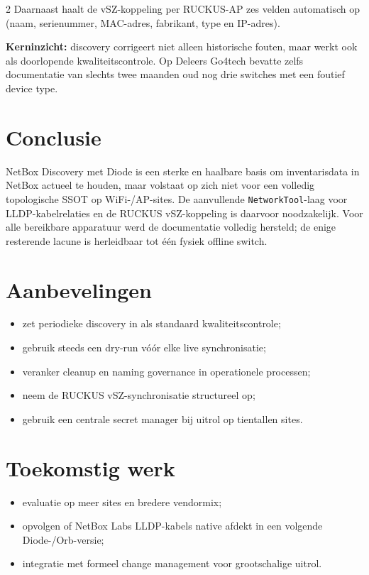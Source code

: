 \documentclass[a0,portrait]{hogent-poster}
\begin{document}
\begin{multicols}{2}
Daarnaast haalt de vSZ-koppeling per RUCKUS-AP zes velden automatisch op (naam, serienummer, MAC-adres, fabrikant, type en IP-adres).

\textbf{Kerninzicht:} discovery corrigeert niet alleen historische fouten, maar werkt ook als doorlopende kwaliteitscontrole. Op Deleers Go4tech bevatte zelfs documentatie van slechts twee maanden oud nog drie switches met een foutief device type.

\section{Conclusie}

NetBox Discovery met Diode is een sterke en haalbare basis om inventarisdata in NetBox actueel te houden, maar volstaat op zich niet voor een volledig topologische SSOT op WiFi-/AP-sites. De aanvullende \texttt{NetworkTool}-laag voor LLDP-kabelrelaties en de RUCKUS vSZ-koppeling is daarvoor noodzakelijk. Voor alle bereikbare apparatuur werd de documentatie volledig hersteld; de enige resterende lacune is herleidbaar tot één fysiek offline switch.

\section{Aanbevelingen}

\begin{itemize}
  \item zet periodieke discovery in als standaard kwaliteitscontrole;
  \item gebruik steeds een dry-run vóór elke live synchronisatie;
  \item veranker cleanup en naming governance in operationele processen;
  \item neem de RUCKUS vSZ-synchronisatie structureel op;
  \item gebruik een centrale secret manager bij uitrol op tientallen sites.
\end{itemize}

\section{Toekomstig werk}

\begin{itemize}
  \item evaluatie op meer sites en bredere vendormix;
  \item opvolgen of NetBox Labs LLDP-kabels native afdekt in een volgende Diode-/Orb-versie;
  \item integratie met formeel change management voor grootschalige uitrol.
\end{itemize}

\end{multicols}
\end{document}
